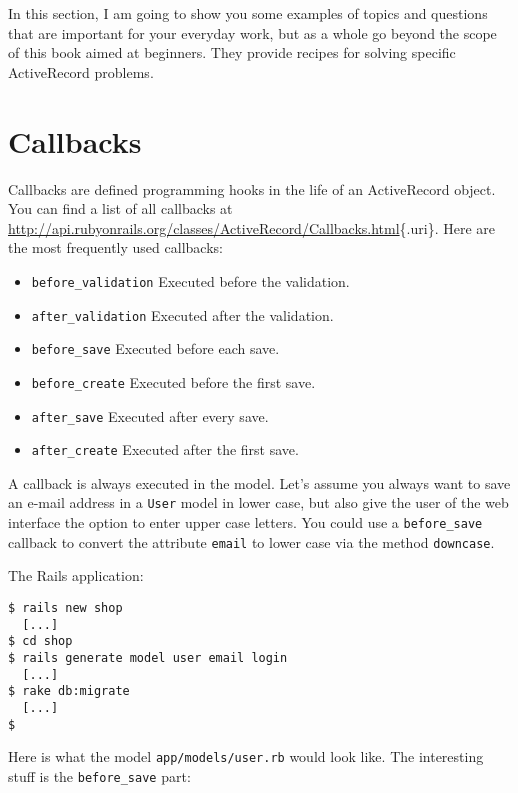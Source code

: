 \documentclass[a4paper]{book}
\begin{document}
In this section, I am going to show you some examples of topics and questions that are important for your everyday work, but as a whole go beyond the scope of this book aimed at beginners. They provide recipes for solving specific ActiveRecord problems.

\section{Callbacks}\label{callbacks}

Callbacks are defined programming hooks in the life of an ActiveRecord object. You can find a list of all callbacks at \url{http://api.rubyonrails.org/classes/ActiveRecord/Callbacks.html}\{.uri\}. Here are the most frequently used callbacks:

\begin{itemize}
\itemsep1pt\parskip0pt
\item
  \texttt{before\_validation} Executed before the validation.
\item
  \texttt{after\_validation} Executed after the validation.
\item
  \texttt{before\_save} Executed before each save.
\item
  \texttt{before\_create} Executed before the first save.
\item
  \texttt{after\_save} Executed after every save.
\item
  \texttt{after\_create} Executed after the first save.
\end{itemize}

A callback is always executed in the model. Let's assume you always want to save an e-mail address in a \texttt{User} model in lower case, but also give the user of the web interface the option to enter upper case letters. You could use a \texttt{before\_save} callback to convert the attribute \texttt{email} to lower case via the method \texttt{downcase}.

The Rails application:

\begin{shaded}\begin{verbatim}
$ rails new shop
  [...]
$ cd shop
$ rails generate model user email login
  [...]
$ rake db:migrate
  [...]
$
\end{verbatim}\end{shaded}

Here is what the model \texttt{app/models/user.rb} would look like. The interesting stuff is the \texttt{before\_save} part:
\end{document}
